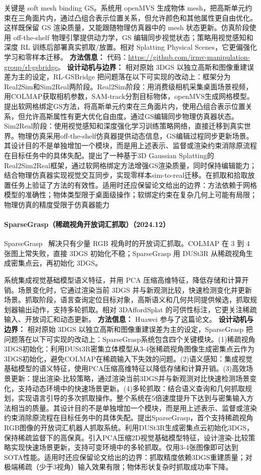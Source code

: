 关键是 soft mesh binding GS。系统用 openMVS 生成物体 mesh，把高斯单元约束在三角面片内，通过凸组合表示位置关系，但允许颜色和其他属性更自由优化。这样既保留 GS 渲染质量，又能跟随物理仿真器中的 mesh 状态更新。仿真阶段使用 off-the-shelf 物理引擎提供动力学，GS 编辑同步视觉状态；策略用视觉感知和深度 RL 训练后部署真实抓取/放置。相对 Splatting Physical Scenes，它更偏强化学习和零样本迁移。
\textbf{方法信息：} 代码：\url{https://github.com/irmv-manipulation-group/rl-gsbridge}。
\textbf{设计动机与边界：} 相对原始 3DGS 以独立高斯和图像重建误差为主的设定，RL-GSBridge 把问题落在以下可实现的改动上：框架分为Real2Sim和Sim2Real两阶段。Real2Sim阶段：用消费级相机采集桌面场景视频，用COLMAP获取相机参数，SAM-track分割目标物体，openMVS生成网格模型。提出软网格绑定GS方法，将高斯单元约束在三角面片内，使用凸组合表示位置关系，但允许高斯属性有更大优化自由度。通过GS编辑同步物理仿真器状态。Sim2Real阶段：使用视觉感知和深度强化学习训练策略网络，直接迁移到真实世界。物理仿真采用off-the-shelf仿真器提供动态信息，GS编辑过程同步更新场景。其设计目的不是单独增加一个模块，而是用上述表示、监督或渲染约束消除原流程在目标任务中的具体失配。提出了一种基于3D Gaussian Splatting的Real2Sim2Real框架，通过软网格绑定方法增强GS渲染质量，同时保持编辑能力；结合物理仿真器实现视觉交互同步，实现零样本sim-to-real迁移。在抓取和拾取放置任务上验证了方法的有效性。适用时还应保留论文给出的边界：方法依赖于网格模型的准确性；物体类型限于桌面级操作；软绑定约束在复杂几何上可能有局限；物理仿真的精度受限于仿真器能力
\paragraph{SparseGrasp（稀疏视角开放词汇抓取）（2024.12）}
SparseGrasp~\cite{2412_02140} 解决只有少量 RGB 视角时的开放词汇抓取。COLMAP 在 3 到 4 张图上常失败，直接 3DGS 初始化不稳；SparseGrasp 用 DUSt3R 从稀疏视角生成密集点云，再初始化 3DGS。

系统集成视觉基础模型语义特征，并用 PCA 压缩高维特征，降低存储和计算开销。场景变化时，它通过渲染当前 3DGS 并与新观测比较，快速检测变化并更新场景。抓取阶段，语言查询定位目标对象，高斯语义和几何共同提供候选，抓取规划器输出动作，支持多轮抓取。相对 3DAffordSplat 的可供性标注，它更关注稀疏输入、开放词汇和动态更新。
\textbf{方法信息：} Huawei 参与了这篇论文。
\textbf{设计动机与边界：} 相对原始 3DGS 以独立高斯和图像重建误差为主的设定，SparseGrasp 把问题落在以下可实现的改动上：SparseGrasp系统包含四个关键模块。(1)稀疏视角3DGS初始化：利用DUSt3R密集立体模型从3-4张稀疏视角图像生成密集点云作为3DGS初始化，避免COLMAP在稀疏输入下失效的问题。(2)语义感知：集成视觉基础模型的语义特征，使用PCA压缩高维特征以降低存储和计算开销。(3)高效场景更新：提出渲染-比较策略，通过渲染当前3DGS并与新观测对比快速检测场景变化，支持动态环境中的快速场景更新。(4)多轮抓取：结合语义查询和几何抓取规划，实现语言引导的多次抓取操作。整个系统在5倍速度提升下达到与密集输入方法相当的质量。其设计目的不是单独增加一个模块，而是用上述表示、监督或渲染约束消除原流程在目标任务中的具体失配。提出SparseGrasp，首个支持稀疏视角RGB图像的开放词汇机器人抓取系统。利用DUSt3R生成密集点云初始化3DGS，保持稀疏监督下的高保真。引入PCA压缩2D视觉基础模型特征，设计渲染-比较策略实现快速场景更新，支持可变环境中的多轮抓取。仅用3-4张图像即可达到SOTA性能。适用时还应保留论文给出的边界：抓取精度依赖3DGS重建质量；对极端稀疏（少于3视角）输入效果有限；物体形状复杂时抓取成功率下降。
